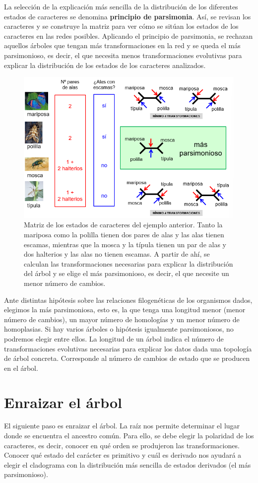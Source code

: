 La selección de la explicación más sencilla de la distribución de los diferentes estados de caracteres se denomina \textbf{principio de parsimonia}. Así, se revisan los caracteres y se construye la matriz para ver cómo se sitúan los estados de los caracteres en las redes posibles. Aplicando el principio de parsimonia, se rechazan aquellos árboles que tengan más transformaciones en la red y se queda el más parsimonioso, es decir, el que necesita menos transformaciones evolutivas para explicar la distribución de los estados de los caracteres analizados. 

\begin{figure}[htbp]
\centering
\includegraphics[width=0.5\linewidth]{figs/ejemplo-matriz-parsimonia.png}
\caption{Matriz de los estados de caracteres del ejemplo anterior. Tanto la mariposa como la polilla tienen dos pares de alas y las alas tienen escamas, mientras que la mosca y la típula tienen un par de alas y dos halterios y las alas no tienen escamas. A partir de ahí, se calculan las transformaciones necesarias para explicar la distribución del árbol y se elige el más parsimonioso, es decir, el que necesite un menor número de cambios.}
\end{figure}

Ante distintas hipótesis sobre las relaciones filogenéticas de los organismos dados, elegimos la más parsimoniosa, esto es, la que tenga una longitud menor (menor número de cambios), un mayor número de homologías y un menor número de homoplasias. Si hay varios árboles o hipótesis igualmente parsimoniosos, no podremos elegir entre ellos. La longitud de un árbol indica el número de transformaciones evolutivas necesarias para explicar los datos dada una topología de árbol concreta. Corresponde al número de cambios de estado que se producen en el árbol.

\section{Enraizar el árbol}
El siguiente paso es enraizar el árbol. La raíz nos permite determinar el lugar donde se encuentra el ancestro común. Para ello, se debe elegir la polaridad de los caracteres, es decir, conocer en qué orden se produjeron las transformaciones. Conocer qué estado del carácter es primitivo y cuál es derivado nos ayudará a elegir el cladograma con la distribución más sencilla de estados derivados (el más parsimonioso).

